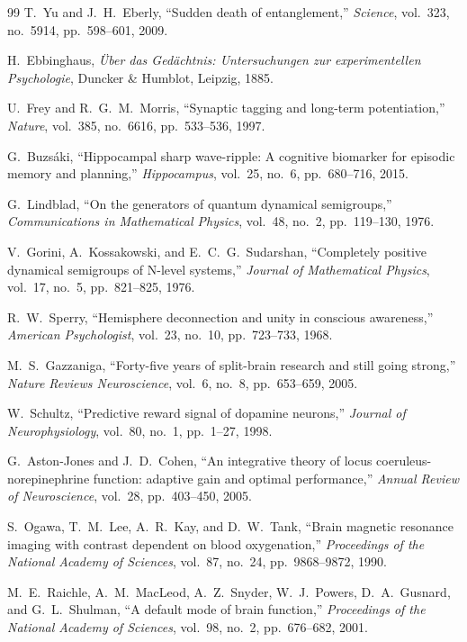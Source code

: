 \documentclass[10pt,twocolumn,3p]{article}
\begin{document}
\begin{thebibliography}{99}
T.~Yu and J.~H.~Eberly,
``Sudden death of entanglement,''
\textit{Science}, vol.~323, no.~5914, pp.~598--601, 2009.

H.~Ebbinghaus,
\textit{\"Uber das Ged\"achtnis: Untersuchungen zur experimentellen Psychologie},
Duncker \& Humblot, Leipzig, 1885.

U.~Frey and R.~G.~M.~Morris,
``Synaptic tagging and long-term potentiation,''
\textit{Nature}, vol.~385, no.~6616, pp.~533--536, 1997.

G.~Buzs\'aki,
``Hippocampal sharp wave-ripple: A cognitive biomarker for episodic memory and planning,''
\textit{Hippocampus}, vol.~25, no.~6, pp.~680--716, 2015.

G.~Lindblad,
``On the generators of quantum dynamical semigroups,''
\textit{Communications in Mathematical Physics}, vol.~48, no.~2, pp.~119--130, 1976.

V.~Gorini, A.~Kossakowski, and E.~C.~G.~Sudarshan,
``Completely positive dynamical semigroups of N-level systems,''
\textit{Journal of Mathematical Physics}, vol.~17, no.~5, pp.~821--825, 1976.

R.~W.~Sperry,
``Hemisphere deconnection and unity in conscious awareness,''
\textit{American Psychologist}, vol.~23, no.~10, pp.~723--733, 1968.

M.~S.~Gazzaniga,
``Forty-five years of split-brain research and still going strong,''
\textit{Nature Reviews Neuroscience}, vol.~6, no.~8, pp.~653--659, 2005.

W.~Schultz,
``Predictive reward signal of dopamine neurons,''
\textit{Journal of Neurophysiology}, vol.~80, no.~1, pp.~1--27, 1998.

G.~Aston-Jones and J.~D.~Cohen,
``An integrative theory of locus coeruleus-norepinephrine function: adaptive gain and optimal performance,''
\textit{Annual Review of Neuroscience}, vol.~28, pp.~403--450, 2005.

S.~Ogawa, T.~M.~Lee, A.~R.~Kay, and D.~W.~Tank,
``Brain magnetic resonance imaging with contrast dependent on blood oxygenation,''
\textit{Proceedings of the National Academy of Sciences}, vol.~87, no.~24, pp.~9868--9872, 1990.

M.~E.~Raichle, A.~M.~MacLeod, A.~Z.~Snyder, W.~J.~Powers, D.~A.~Gusnard, and G.~L.~Shulman,
``A default mode of brain function,''
\textit{Proceedings of the National Academy of Sciences}, vol.~98, no.~2, pp.~676--682, 2001.


\end{thebibliography}
\end{document}
